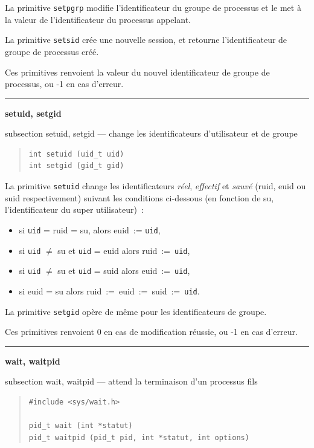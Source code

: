 \documentclass [twoside] {report}
\newcommand {\primitive} [1]
    {
	\phantomsection
	{\large \textbf {#1}}
	\addcontentsline {toc} {subsection} {#1}
    }
\newcommand {\separation}
    {
	\vspace {5mm}
	\nopagebreak
	\hrule
    }
\begin{document}
La primitive \texttt {setpgrp} modifie l'identificateur du groupe
de processus et le met à la valeur de l'identificateur du
processus appelant.

La primitive \texttt {setsid} crée une nouvelle session, et retourne
l'identificateur de groupe de processus créé.

Ces primitives renvoient la valeur du nouvel identificateur
de groupe de processus, ou -1 en cas d'erreur.




\separation
\primitive {setuid, setgid} --- change les identificateurs d'utilisateur et de groupe

\begin {quote}
\begin {verbatim}
int setuid (uid_t uid)
int setgid (gid_t gid)
\end{verbatim}
\end {quote}

La primitive \texttt {setuid} change les identificateurs
\textit {réel}, \textit {effectif} et \textit {sauvé} (ruid, euid ou
suid respectivement) suivant les conditions
ci-dessous (en fonction de su, l'identificateur du
super utilisateur)~:

\begin {itemize}
\item si \texttt {uid} = ruid = su, alors euid~:= \texttt {uid},
\item si \texttt {uid} {$\neq$} su et \texttt {uid} = euid alors ruid~:=~\texttt {uid},
\item si \texttt {uid} {$\neq$} su et \texttt {uid} = suid alors euid~:=~\texttt {uid},
\item si euid = su alors ruid~:=~euid~:=~suid~:=~\texttt {uid}.
\end {itemize}

La primitive \texttt {setgid} opère de même pour les
identificateurs de groupe.

Ces primitives renvoient 0 en cas de modification
réussie, ou -1 en cas d'erreur.




\separation
\primitive {wait, waitpid} --- attend la terminaison d'un processus fils

\begin {quote}
\begin {verbatim}
#include <sys/wait.h>

pid_t wait (int *statut)
pid_t waitpid (pid_t pid, int *statut, int options)
\end{verbatim}
\end {quote}
\end{document}
